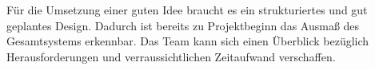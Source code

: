 
Für die Umsetzung einer guten Idee braucht es ein strukturiertes und gut geplantes Design. Dadurch ist bereits zu Projektbeginn das Ausmaß des Gesamtsystems erkennbar. Das Team kann sich einen Überblick bezüglich Herausforderungen und verraussichtlichen Zeitaufwand verschaffen.
